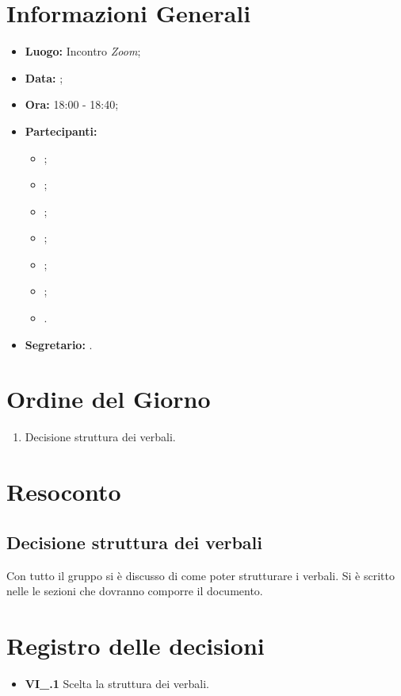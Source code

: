 \section{Informazioni Generali}
\begin{itemize}
\item \textbf{Luogo:} Incontro \textit{Zoom};
\item \textbf{Data:} \Data;
\item \textbf{Ora:} 18:00 - 18:40;
\item \textbf{Partecipanti:}
	\begin{itemize}
		\item \BL{}; 
		\item \FF{};
		\item \MM{}; 
		\item \PC{};
		\item \TG{};
		\item \TL{};
		\item \VD{}.
	\end{itemize} 
\item \textbf{Segretario:} \PC{}.
\end{itemize}

\section{Ordine del Giorno}
\begin{enumerate}
 \item Decisione struttura dei verbali.
\end{enumerate}

\section{Resoconto}
\subsection{Decisione struttura dei verbali}
Con tutto il gruppo si è discusso di come poter strutturare i verbali. Si è scritto nelle \textit{\NdP} le sezioni che dovranno comporre il documento.

\section{Registro delle decisioni}
\begin{itemize}
  \item \textbf{VI\_\Data.1} Scelta la struttura dei verbali.
\end{itemize}





